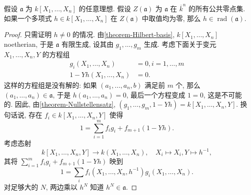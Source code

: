 \begin{theorem}[强 Nullstellensatz]
  \label{theorem-strong-Nullstellensatz}
  假设 \( \mathfrak{a} \) 为 \( k[X_1, \ldots, X_n] \) 的任意理想.
  假设 \( Z(\mathfrak{a}) \) 为 \( \mathfrak{a} \) 在 \( \overline{k}^n \)
  的所有公共零点集.
  如果一个多项式 \( h \in k[X_1, \ldots, X_n] \) 在 \( Z(\mathfrak{a}) \)
  中取值均为零, 那么 \( h \in \operatorname{rad}(\mathfrak{a}) \).
\end{theorem}
\begin{proof}
  只需证明 \( h \neq 0 \) 的情况.
  由\cref{theorem-Hilbert-basis}, \( k[X_1, \ldots, X_n] \) noetherian, 于是 \(
  \mathfrak{a} \) 有限生成, 设其由 \( g_1, \ldots, g_m \) 生成.
  考虑下面关于变元 \( X_1, \ldots, X_n, Y \) 的方程组
  \[
    \begin{split}
      g_i(X_1, \ldots, X_n) &= 0, i = 1, \ldots, m\\
      1 - Yh(X_1, \ldots, X_n) &= 0.
    \end{split}
  \]
  这样的方程组是没有解的: 如果 \( (a_1, \ldots, a_n, b) \) 满足前 \( m \) 个,
  那么 \( (a_1, \ldots, a_n) \in \mathfrak{a} \), 于是 \( h(a_1, \ldots, a_n) =
  0 \), 最后一个方程变成 \( 1 = 0 \), 这是不可能的.
  因此, 由\cref{theorem-Nullstellensatz}, \( (g_1, \ldots, g_m, 1 - Yh) = k[X_1,
  \ldots, X_n, Y] \).
  换句话说, 存在 \( f_i \in k[X_1, \ldots, X_n, Y] \) 使得
  \[
    1 = \sum_{i = 1}^mf_i g_i + f_{m + 1}(1 - Yh).
  \]
  考虑态射
  \[
    k[X_1, \ldots, X_n, Y] \to k(X_1, \ldots, X_n),\quad X_i \mapsto X_i, Y
    \mapsto h^{-1},
  \]
  其将 \( \sum_{i = 1}^mf_i g_i + f_{m + 1}(1 - Yh) \) 映到
  \[
    1 = \sum_i f_i(X_1, \ldots, X_n, h^{-1})g_i(X_1, \ldots, X_n).
  \]
  对足够大的 \( N \), 两边乘以 \( h^N \) 知道 \( h^N \in \mathfrak{a} \).
\end{proof}

